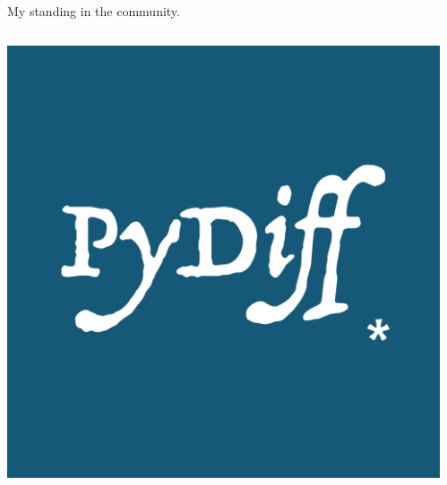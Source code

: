 \documentclass{beamer}
\begin{document}
\begin{frame}{My standing in the community.}
    \begin{columns}
        \begin{column}{0.3\textwidth}
            \begin{center}
                \includegraphics[width=\textwidth]{static/PyDiff.png}
            \end{center}
        \end{column}   
        \begin{column}{0.2\textwidth}
            \begin{center}

\end{center}
\end{column}
\end{columns}
\end{frame}
\end{document}
